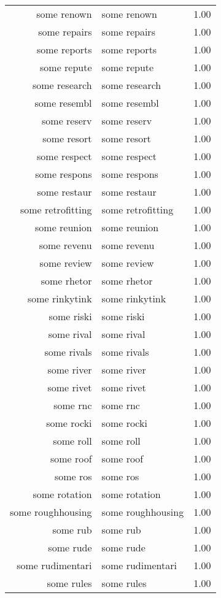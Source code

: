 \begin{table}[ht]
\begin{tabular}{rlr}
  some renown & some renown & 1.00 \\ 
  some repairs & some repairs & 1.00 \\ 
  some reports & some reports & 1.00 \\ 
  some repute & some repute & 1.00 \\ 
  some research & some research & 1.00 \\ 
  some resembl & some resembl & 1.00 \\ 
  some reserv & some reserv & 1.00 \\ 
  some resort & some resort & 1.00 \\ 
  some respect & some respect & 1.00 \\ 
  some respons & some respons & 1.00 \\ 
  some restaur & some restaur & 1.00 \\ 
  some retrofitting & some retrofitting & 1.00 \\ 
  some reunion & some reunion & 1.00 \\ 
  some revenu & some revenu & 1.00 \\ 
  some review & some review & 1.00 \\ 
  some rhetor & some rhetor & 1.00 \\ 
  some rinkytink & some rinkytink & 1.00 \\ 
  some riski & some riski & 1.00 \\ 
  some rival & some rival & 1.00 \\ 
  some rivals & some rivals & 1.00 \\ 
  some river & some river & 1.00 \\ 
  some rivet & some rivet & 1.00 \\ 
  some rnc & some rnc & 1.00 \\ 
  some rocki & some rocki & 1.00 \\ 
  some roll & some roll & 1.00 \\ 
  some roof & some roof & 1.00 \\ 
  some ros & some ros & 1.00 \\ 
  some rotation & some rotation & 1.00 \\ 
  some roughhousing & some roughhousing & 1.00 \\ 
  some rub & some rub & 1.00 \\ 
  some rude & some rude & 1.00 \\ 
  some rudimentari & some rudimentari & 1.00 \\ 
  some rules & some rules & 1.00 \\ 

\end{tabular}
\end{table}
